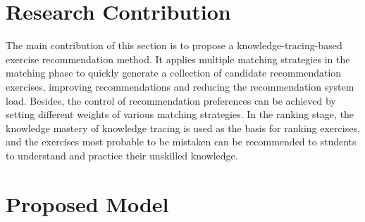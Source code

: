 \section{Research Contribution}
The main contribution of this section is to propose a knowledge-tracing-based exercise recommendation method. It applies multiple matching strategies in the matching phase to quickly generate a collection of candidate recommendation exercises, improving recommendations and reducing the recommendation system load. Besides, the control of recommendation preferences can be achieved by setting different weights of various matching strategies. In the ranking stage, the knowledge mastery of knowledge tracing is used as the basis for ranking exercises, and the exercises most probable to be mistaken can be recommended to students to understand and practice their unskilled knowledge.

\section{Proposed Model}

